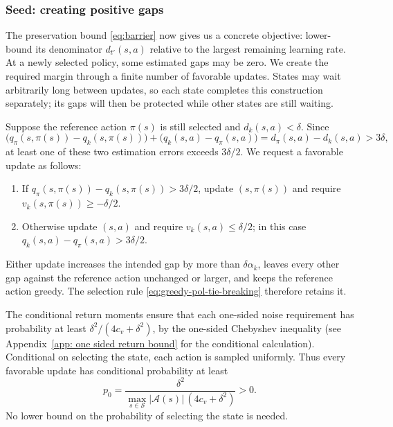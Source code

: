\documentclass[twoside,11pt]{article}
\DeclareRobustCommand{\reviewbarstart}{%
  \ifhmode %
    \vadjust{\vbox to 0pt{%
      \vskip-\ht\strutbox %
      \vskip-\dp\strutbox %
      \cbstart[\changebarwidth] %
      \vss %
    }}%
  \else %
    \cbstart[\changebarwidth]%
  \fi %
} %
\providecommand{\DIFadd}[1]{#1} %
\providecommand{\DIFaddbegin}{\reviewbarstart} %
\providecommand{\DIFaddend}{\protect\cbend} %
\def\DIFadd#1{#1}%
\def\DIFaddbegin{}%
\def\DIFaddend{}%
\begin{document}
\DIFaddbegin \subsubsection{\DIFadd{Seed: creating positive gaps}}
\DIFadd{The preservation bound \eqref{eq:barrier} now gives us a concrete objective: lower-bound its denominator $d_{t'}(s,a)$ relative to the largest remaining learning rate. At a newly selected policy, some estimated gaps may be zero. We create the required margin through a finite number of favorable updates. States may wait arbitrarily long between updates, so each state completes this construction separately; its gaps will then be protected while other states are still waiting.
}\DIFaddend 

 \DIFaddbegin \DIFadd{Suppose the reference action $\pi(s)$ is still selected and $d_k(s,a)<\delta$. Since
}\[
\DIFadd{\big(q_\pi(s,\pi(s))-q_k(s,\pi(s))\big)
+\big(q_k(s,a)-q_\pi(s,a)\big)
=d_\pi(s,a)-d_k(s,a)>3\delta,
}\]\DIFaddend 
\DIFaddbegin \DIFadd{at least one of these two estimation errors exceeds $3\delta/2$. We request a favorable update as follows:
}\begin{enumerate}
\item \DIFadd{If $q_\pi(s,\pi(s))-q_k(s,\pi(s))>3\delta/2$, update $(s,\pi(s))$ and require $v_k(s,\pi(s))\ge-\delta/2$.
}\item \DIFadd{Otherwise update $(s,a)$ and require $v_k(s,a)\le\delta/2$; in this case $q_k(s,a)-q_\pi(s,a)>3\delta/2$.
}\end{enumerate}
\DIFadd{Either update increases the intended gap by more than $\delta\alpha_k$, leaves every other gap against the reference action unchanged or larger, and keeps the reference action greedy. The selection rule \eqref{eq:greedy-pol-tie-breaking} therefore retains it.
}\DIFaddend 

 \DIFaddbegin \DIFadd{The conditional return moments ensure that each one-sided noise requirement has probability at least $\delta^2/(4c_v+\delta^2)$, by the one-sided Chebyshev inequality (see Appendix~\ref{app: one sided return bound} for the conditional calculation). Conditional on selecting the state, each action is sampled uniformly. Thus every favorable update has conditional probability at least
}\begin{equation}
\DIFadd{\label{eq:localprob}
p_0=\frac{\delta^2}{\max_{s\in\mathcal S}|\mathcal A(s)|\,(4c_v+\delta^2)}>0.
}\end{equation}\DIFaddend 
\DIFaddbegin \DIFadd{No lower bound on the probability of selecting the state is needed.
}\DIFaddend 
\end{document}

